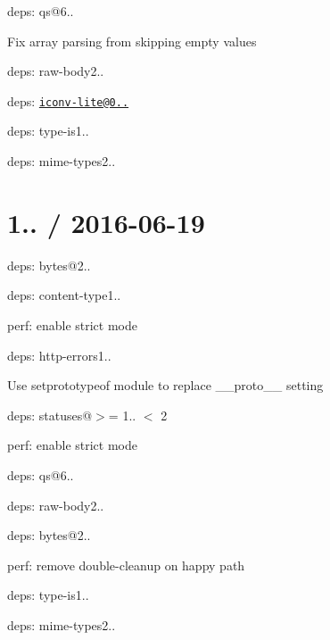 \begin{DoxyItemize}
\item deps\+: qs@6..
\begin{DoxyItemize}
\item Fix array parsing from skipping empty values
\end{DoxyItemize}
\item deps\+: raw-\/body2..
\begin{DoxyItemize}
\item deps\+: \href{mailto:iconv-lite@0.4.15}{\tt iconv-\/lite@0..}
\end{DoxyItemize}
\item deps\+: type-\/is1..
\begin{DoxyItemize}
\item deps\+: mime-\/types2..
\end{DoxyItemize}
\end{DoxyItemize}

\section*{1.. / 2016-\/06-\/19 }


\begin{DoxyItemize}
\item deps\+: bytes@2..
\item deps\+: content-\/type1..
\begin{DoxyItemize}
\item perf\+: enable strict mode
\end{DoxyItemize}
\item deps\+: http-\/errors1..
\begin{DoxyItemize}
\item Use {\ttfamily setprototypeof} module to replace {\ttfamily \+\_\+\+\_\+proto\+\_\+\+\_\+} setting
\item deps\+: statuses@\textquotesingle{}$>$= 1.. $<$ 2\textquotesingle{}
\item perf\+: enable strict mode
\end{DoxyItemize}
\item deps\+: qs@6..
\item deps\+: raw-\/body2..
\begin{DoxyItemize}
\item deps\+: bytes@2..
\item perf\+: remove double-\/cleanup on happy path
\end{DoxyItemize}
\item deps\+: type-\/is1..
\begin{DoxyItemize}
\item deps\+: mime-\/types2..
\end{DoxyItemize}
\end{DoxyItemize}

